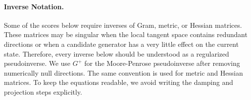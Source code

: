 \documentclass[
  reprint,
  amsmath,
  amssymb,
  aps,
  pra,
  nofootinbib,
  superscriptaddress,
  floatfix
]{revtex4-2}
\begin{document}
\paragraph*{Inverse Notation.}
Some of the scores below require inverses of Gram, metric, or Hessian matrices. These matrices may be singular when the local tangent space contains redundant directions or when a candidate generator has a very little effect on the current state. Therefore, every inverse below should be understood as a regularized pseudoinverse. We use \(G^+\) for the Moore-Penrose pseudoinverse after removing numerically null directions. The same convention is used for metric and Hessian matrices. To keep the equations readable, we avoid writing the damping and projection steps explicitly.
\end{document}
